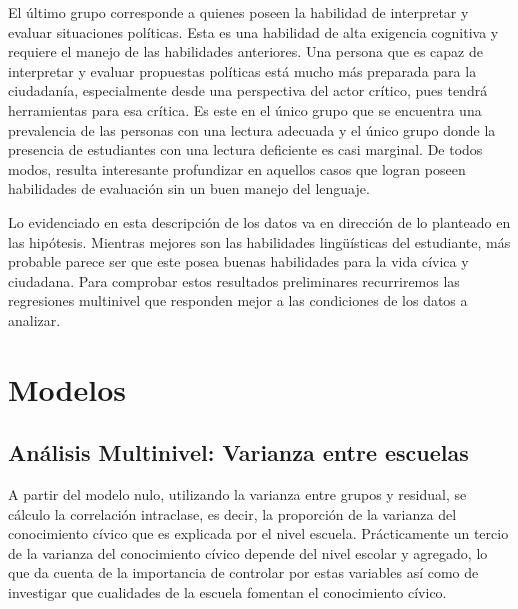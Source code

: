 \documentclass[12pt,twoside]{templates/facsothesis}
\begin{document}
El último grupo corresponde a quienes poseen la habilidad de interpretar y evaluar situaciones políticas. Esta es una habilidad de alta exigencia cognitiva y requiere el manejo de las habilidades anteriores. Una persona que es capaz de interpretar y evaluar propuestas políticas está mucho más preparada para la ciudadanía, especialmente desde una perspectiva del actor crítico, pues tendrá herramientas para esa crítica. Es este en el único grupo que se encuentra una prevalencia de las personas con una lectura adecuada y el único grupo donde la presencia de estudiantes con una lectura deficiente es casi marginal. De todos modos, resulta interesante profundizar en aquellos casos que logran poseen habilidades de evaluación sin un buen manejo del lenguaje.

Lo evidenciado en esta descripción de los datos va en dirección de lo planteado en las hipótesis. Mientras mejores son las habilidades lingüísticas del estudiante, más probable parece ser que este posea buenas habilidades para la vida cívica y ciudadana. Para comprobar estos resultados preliminares recurriremos las regresiones multinivel que responden mejor a las condiciones de los datos a analizar.

\hypertarget{modelos}{%
\section{Modelos}\label{modelos}}

\hypertarget{anuxe1lisis-multinivel-varianza-entre-escuelas}{%
\subsection{Análisis Multinivel: Varianza entre escuelas}\label{anuxe1lisis-multinivel-varianza-entre-escuelas}}

A partir del modelo nulo, utilizando la varianza entre grupos y residual, se cálculo la correlación intraclase, es decir, la proporción de la varianza del conocimiento cívico que es explicada por el nivel escuela. Prácticamente un tercio de la varianza del conocimiento cívico depende del nivel escolar y agregado, lo que da cuenta de la importancia de controlar por estas variables así como de investigar que cualidades de la escuela fomentan el conocimiento cívico.
\end{document}
